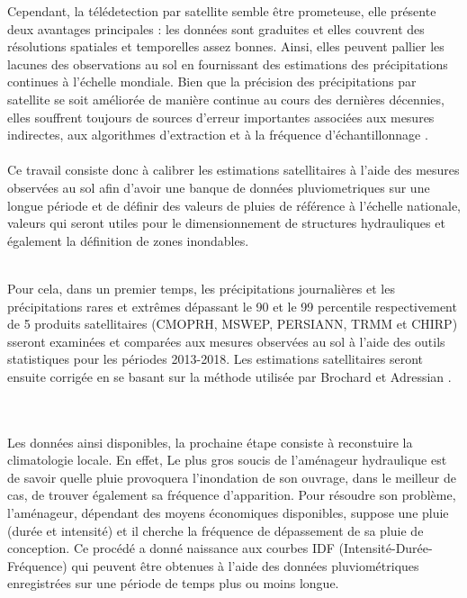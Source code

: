 Cependant, la t\'el\'edetection par satellite semble \^etre prometeuse, elle pr\'esente deux avantages principales : les donn\'ees sont graduites et elles couvrent des r\'esolutions spatiales et temporelles assez bonnes. Ainsi, elles peuvent pallier les lacunes des observations au sol en fournissant des estimations des précipitations continues à l'échelle mondiale. Bien que la précision des précipitations par satellite se soit améliorée de manière continue au cours des dernières décennies, elles souffrent toujours de sources d'erreur importantes associées aux mesures indirectes, aux algorithmes d'extraction et à la fréquence d'échantillonnage \cite{zhang_suitability_2019}. \\
\ \\
Ce travail consiste donc \`a calibrer les estimations satellitaires \`a l'aide des mesures observ\'ees au sol afin d'avoir une banque de donn\'ees pluviometriques sur une longue p\'eriode et de d\'efinir des valeurs de pluies de r\'ef\'erence  à l’échelle nationale, valeurs qui seront utiles pour le dimensionnement de structures hydrauliques et également la définition de zones inondables.\\ \ \\
\begin{sloppypar}
 Pour cela, dans un premier temps, les précipitations journali\`eres et les précipitations rares et extrêmes dépassant le 90 et le 99  percentile respectivement de 5 produits satellitaires (CMOPRH, MSWEP, PERSIANN, TRMM et CHIRP) sseront examinées et comparées aux mesures observ\'ees au sol \`a l'aide des outils statistiques \cite{fang_evaluation_2019} pour les périodes 2013-2018. Les estimations satellitaires seront ensuite corrig\'ee en se basant sur la m\'ethode utilis\'ee par Brochard et Adressian  \cite{brochart_correction_2014}.
 \end{sloppypar}
  \\ \ \\
Les données ainsi disponibles, la prochaine étape consiste \`a reconstuire la climatologie locale.
En effet, Le plus gros soucis de l'aménageur hydraulique est de savoir quelle pluie provoquera l'inondation de son ouvrage, dans le meilleur de cas, de trouver également sa fréquence d'apparition. Pour résoudre son problème, l'aménageur, dépendant des moyens économiques disponibles, suppose une pluie (durée et intensité) et il cherche la fréquence de dépassement de sa pluie de conception. Ce procédé a donné naissance aux courbes IDF (Intensité-Durée-Fréquence) qui peuvent être obtenues \`a l'aide des données pluviométriques enregistr\'ees sur une période de temps plus ou moins longue.\\
